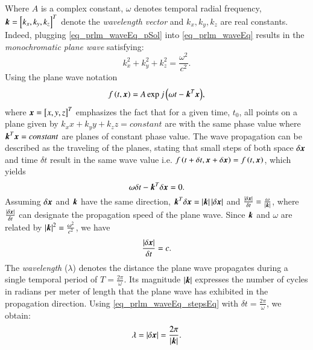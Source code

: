 Where $A$ is a complex constant, $\omega$ denotes temporal radial frequency, $\boldsymbol{k} = \left[{k_{x},k_{y},k_{z}}\right]^{T}$ denote the \emph{wavelength vector} and $k_{x},k_{y},k_{z}$ are real constants. 
Indeed, plugging \eqref{eq_prlm_waveEq_pSol} into \eqref{eq_prlm_waveEq} results in the \emph{monochromatic plane wave} satisfying:
\begin{equation}
\label{eq_prlm_waveEq_subs}
k_{x}^{2}+k_{y}^{2}+k_{z}^{2} = \frac{\omega^{2}}{c^{2}}.
\end{equation}
Using the plane wave notation
\begin{equation}
\label{eq_prlm_waveEq_finSol}
f\left({t,\boldsymbol{x}}\right)=A\exp{j\left({\omega{t}-\boldsymbol{k}^{T}\boldsymbol{x}}\right)},
\end{equation}
where $ \boldsymbol{x} = \left[{x,y,z}\right]^{T} $ emphasizes the fact that for a given time, $t_{0}$, all points on a plane given by $k_{x}x+k_{y}y+k_{z}z = constant$ are with the same phase value where $\boldsymbol{k}^{T}\boldsymbol{x}=constant$ are planes of constant phase value.
The wave propagation can be described as the traveling of the planes, stating that small steps of both space $\delta{\boldsymbol{x}}$ and time $\delta{t}$ result in the same wave value i.e. $f\left({t+\delta{t},\boldsymbol{x}+\delta{\boldsymbol{x}}}\right) = f\left({t,\boldsymbol{x}}\right)$, which yields
\begin{equation}
\omega\delta{t}-\boldsymbol{k}^{T}\delta\boldsymbol{x}=0.
\end{equation}
Assuming $\delta\boldsymbol{x}$ and $\boldsymbol{k}$ have the same direction, $\boldsymbol{k}^{T}\delta\boldsymbol{x} = \left\vert\boldsymbol{k}\right\vert\left\vert\delta\boldsymbol{x}\right\vert$ and $\frac{\left\vert\delta{\boldsymbol{x}}\right\vert}{\delta{t}} = \frac{\omega}{\left\vert\boldsymbol{k}\right\vert}$, where $\frac{\left\vert\delta{\boldsymbol{x}}\right\vert}{\delta{t}}$ can designate the propagation speed of the plane wave. 
Since $\boldsymbol{k}$ and $\omega$ are related by $\left\vert\boldsymbol{k}\right\vert^{2}=\frac{\omega^{2}}{c^{2}}$, we have
\begin{equation}
\label{eq_prlm_waveEq_stepsEq}
\frac{\left\vert\delta{\boldsymbol{x}}\right\vert}{\delta{t}}=c.
\end{equation}
The \emph{wavelength} ($\lambda$) denotes the distance the plane wave propagates during a single temporal period of $T=\frac{2\pi}{\omega}$.
Its magnitude $\left\vert\boldsymbol{k}\right\vert$ expresses the number of cycles in radians per meter of length that the plane wave has exhibited in the propagation direction.
Using \eqref{eq_prlm_waveEq_stepsEq} with $\delta{t} = \frac{2\pi}{\omega}$, we obtain:
\begin{equation}
\lambda=\left\vert\delta{\boldsymbol{x}}\right\vert=\frac{2\pi}{\left\vert\boldsymbol{k}\right\vert}.
\end{equation}
